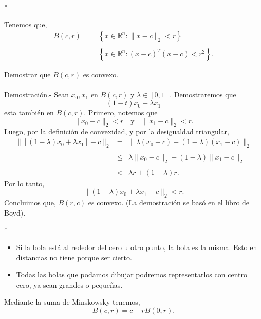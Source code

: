 \begin{paracol}{2}
\switchcolumn[1]*{\scriptsize
\begin{center}
\end{center}
}
\switchcolumn[0]\noindent
Tenemos que,
$$
\begin{array}{rcl}
    B(c,r)&=&\left\{x\in \mathbb{R}^n : \|x-c\|_2<r\right\}\\\\
	  &=& \left\{x\in \mathbb{R}^n : (x-c)^T(x-c)<r^2\right\}.
\end{array}
$$

{\color{blue}
\begin{ejer}
    Demostrar que $B(c,r)$ es convexo.\\\\
	Demostración.-\; Sean $x_0,x_1$ en $B(c,r)$ y $\lambda\in[0,1]$. Demostraremos que 
	$$(1-t)x_0+\lambda x_1$$
	esta también en $B(c,r)$. Primero, notemos que 
	$$\|x_0-c\|_2<r \quad \text{y}\quad \|x_1-c\|_2<r.$$
	Luego, por la definición de convexidad, y por la desigualdad triangular,
	$$
	\begin{array}{rcl}
	    \|\left[(1-\lambda)x_0+\lambda x_1\right]-c\|_2&=&\|\lambda(x_0-c)+(1-\lambda)(x_1-c)\|_2\\\\
					      &\leq& \lambda\|x_0-c\|_2+(1-\lambda)\|x_1-c\|_2\\\\
					      &<& \lambda r+(1-\lambda)r.
	\end{array}
	$$
	Por lo tanto,
	$$\|(1-\lambda)x_0+\lambda x_1-c\|_2<r.$$
	Concluimos que, $B(r,c)$ es convexo. (La demostración se basó en el libro de Boyd).
\end{ejer}
}

\switchcolumn[1]*{\noindent\scriptsize
    \begin{itemize}
	\item Si la bola está al rededor del cero u otro punto, la bola es la misma. Esto en distancias no tiene porque ser cierto.
	\item Todas las bolas que podamos dibujar podremos representarlos con centro cero, ya sean grandes o pequeñas.
    \end{itemize}
}
\switchcolumn[0]\noindent
\begin{prop}
    Mediante la suma de Minskowsky tenemos,
    $$B(c,r)=c+rB(0,r).$$
\end{prop}


\end{paracol}
